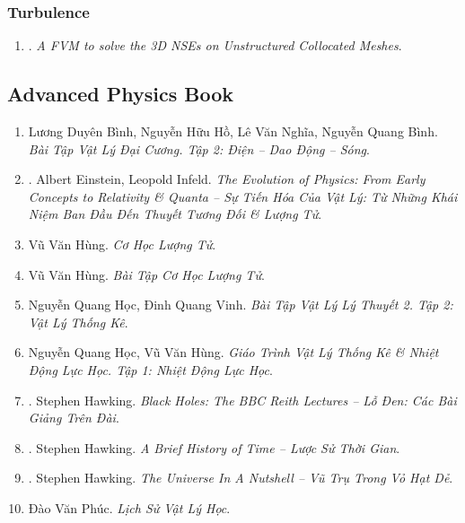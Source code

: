 \documentclass{article}
\begin{document}
\subsubsection{Turbulence}

\begin{enumerate}
	\item \cite{Perron_Boivin_Herard2004}. {\it A FVM to solve the 3{D} NSEs on Unstructured Collocated Meshes}.\hfill{\sf[reading]}
\end{enumerate}


\subsection{Advanced Physics Book}

\begin{enumerate}
	\item Lương Duyên Bình, Nguyễn Hữu Hồ, Lê Văn Nghĩa, Nguyễn Quang Bình. {\it Bài Tập Vật Lý Đại Cương. Tập 2: Điện -- Dao Động -- Sóng}.
	\item \cite{Einstein_Infeld_tien_hoa_Vat_Ly}. Albert Einstein, Leopold Infeld. {\it The Evolution of Physics: From Early Concepts to Relativity \& Quanta -- Sự Tiến Hóa Của Vật Lý: Từ Những Khái Niệm Ban Đầu Đến Thuyết Tương Đối \& Lượng Tử}.\hfill{\sf[done]}
	\item Vũ Văn Hùng. {\it Cơ Học Lượng Tử}.
	\item Vũ Văn Hùng. {\it Bài Tập Cơ Học Lượng Tử}.
	\item Nguyễn Quang Học, Đinh Quang Vinh. {\it Bài Tập Vật Lý Lý Thuyết 2. Tập 2: Vật Lý Thống Kê}.
	\item Nguyễn Quang Học, Vũ Văn Hùng. {\it Giáo Trình Vật Lý Thống Kê \& Nhiệt Động Lực Học. Tập 1: Nhiệt Động Lực Học}.
	\item \cite{Hawking_bbc}. Stephen Hawking. {\it Black Holes: The BBC Reith Lectures -- Lỗ Đen: Các Bài Giảng Trên Đài}.\hfill{\sf[done]}
	\item \cite{Hawking_lstg}. Stephen Hawking. {\it A Brief History of Time -- Lược Sử Thời Gian}.\hfill{\sf[done]}
	\item \cite{Hawking_vttvhd}. Stephen Hawking. {\it The Universe In A Nutshell -- Vũ Trụ Trong Vỏ Hạt Dẻ}.\hfill{\sf[done]}
	\item Đào Văn Phúc. {\it Lịch Sử Vật Lý Học}.
\end{enumerate}
\end{document}
